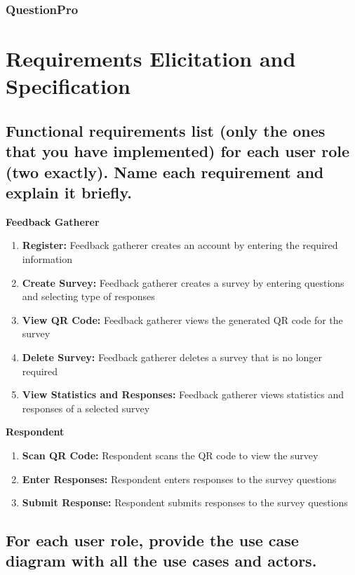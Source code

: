 \documentclass[letterpaper, 12 pt, conference]{ieeeconf}
\begin{document}
\hfill \break
\subsubsection*{QuestionPro}


\newpage
\section{Requirements Elicitation and Specification}
\subsection{Functional requirements list (only the ones that you have implemented) for each user role (two exactly). Name each requirement and explain it briefly.}
\linebreak

\textbf{Feedback Gatherer}
\begin{enumerate}
   \item \textbf{Register:} Feedback gatherer creates an account by entering the required information
   \item \textbf{Create Survey:} Feedback gatherer creates a survey by entering questions and selecting type of responses
   \item \textbf{View QR Code:} Feedback gatherer views the generated QR code for the survey
   \item \textbf{Delete Survey:} Feedback gatherer deletes a survey that is no longer required
   \item \textbf{View Statistics and Responses:} Feedback gatherer views statistics and responses of a selected survey
\end{enumerate}
\newline 
\hfill \break

\textbf{Respondent}
\begin{enumerate}
   \item \textbf{Scan QR Code:} Respondent scans the QR code to view the survey
   \item \textbf{Enter Responses:} Respondent enters responses to the survey questions
   \item \textbf{Submit Response:} Respondent submits responses to the survey questions
\end{enumerate}

\newpage

\subsection{For each user role, provide the use case diagram with all the use cases and actors.}
\hfill \break
\end{document}

